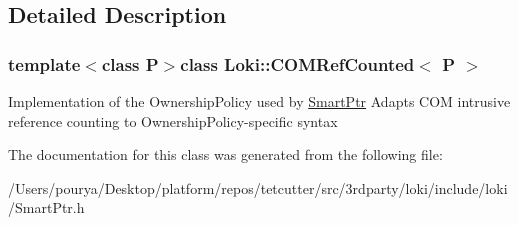 \subsection{Detailed Description}
\subsubsection*{template$<$class P$>$class Loki\+::\+C\+O\+M\+Ref\+Counted$<$ P $>$}

Implementation of the Ownership\+Policy used by \hyperlink{classLoki_1_1SmartPtr}{Smart\+Ptr} Adapts C\+O\+M intrusive reference counting to Ownership\+Policy-\/specific syntax 

The documentation for this class was generated from the following file\+:\begin{DoxyCompactItemize}
\item 
/\+Users/pourya/\+Desktop/platform/repos/tetcutter/src/3rdparty/loki/include/loki/Smart\+Ptr.\+h\end{DoxyCompactItemize}
